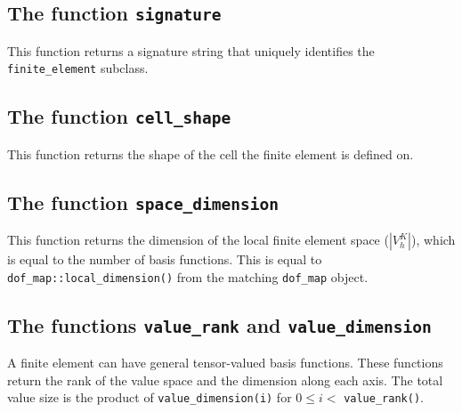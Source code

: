 




\subsection{The function \texttt{signature}}
This function returns a signature string that uniquely identifies the \texttt{finite\_element} subclass.


\subsection{The function \texttt{cell\_shape}}
This function returns the shape of the cell the finite element is defined on.


\subsection{The function \texttt{space\_dimension}}
This function returns the dimension of the local finite element space ($| V_h^K |$),
which is equal to the number of basis functions. This is equal to \texttt{dof\_map::local\_dimension()}
from the matching \texttt{dof\_map} object.



\subsection{The functions \texttt{value\_rank} and \texttt{value\_dimension}}
A finite element can have general tensor-valued basis functions.
These functions return the rank of the value space and the dimension along each axis.
The total value size is the product of \texttt{value\_dimension(i)} for $0 \le i <$ \texttt{value\_rank()}.


